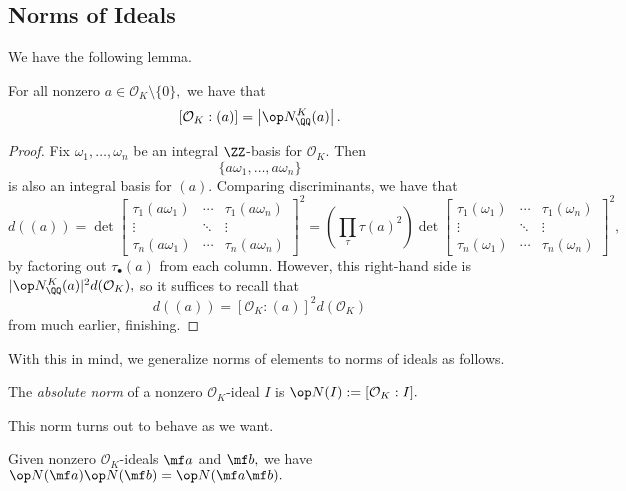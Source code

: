 \documentclass[../notes.tex]{subfiles}
\begin{document}
\subsection{Norms of Ideals}
We have the following lemma.
\begin{lemma}
    For all nonzero $a\in\mathcal O_K\setminus\{0\},$ we have that
    \[[\mathcal O_K:(a)]=\left|\op N_\QQ^K(a)\right|.\]
\end{lemma}
\begin{proof}
    Fix $\omega_1,\ldots,\omega_n$ be an integral $\ZZ$-basis for $\mathcal O_K.$ Then
    \[\{a\omega_1,\ldots,a\omega_n\}\]
    is also an integral basis for $(a).$ Comparing discriminants, we have that
    \[d((a))=\det\begin{bmatrix}
        \tau_1(a\omega_1) & \cdots & \tau_1(a\omega_n) \\
        \vdots & \ddots & \vdots \\
        \tau_n(a\omega_1) & \cdots & \tau_n(a\omega_n)
    \end{bmatrix}^2=\left(\prod_\tau\tau(a)^2\right)\det\begin{bmatrix}
        \tau_1(\omega_1) & \cdots & \tau_1(\omega_n) \\
        \vdots & \ddots & \vdots \\
        \tau_n(\omega_1) & \cdots & \tau_n(\omega_n)
    \end{bmatrix}^2,\]
    by factoring out $\tau_\bullet(a)$ from each column. However, this right-hand side is $|\op N_\QQ^K(a)|^2d(\mathcal O_K),$ so it suffices to recall that
    \[d((a))=[\mathcal O_K:(a)]^2d(\mathcal O_K)\]
    from much earlier, finishing.
\end{proof}
With this in mind, we generalize norms of elements to norms of ideals as follows.
\begin{definition}
    The \textit{absolute norm} of a nonzero $\mathcal O_K$-ideal $I$ is $\op N(I):=[\mathcal O_K:I].$
\end{definition}
This norm turns out to behave as we want.
\begin{proposition}
    Given nonzero $\mathcal O_K$-ideals $\mf a$ and $\mf b,$ we have $\op N(\mf a)\op N(\mf b)=\op N(\mf a\mf b).$
\end{proposition}
\end{document}

